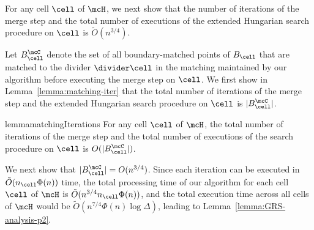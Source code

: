 
For any cell $\cell$ of $\mcH$, we next show that the number of iterations of the merge step and the total number of executions of the extended Hungarian search procedure on $\cell$ is $\tilde{O}(n^{3/4})$.


Let $B_\cell^\mcC$ denote the set of all boundary-matched points of $B_\cell$ that are matched to the divider $\divider\cell$ in the matching maintained by our algorithm before executing the merge step on $\cell$. We first show in Lemma~\ref{lemma:matching-iter} that the total number of iterations of the merge step and the extended Hungarian search procedure on $\cell$ is $|B_\cell^\mcC|$.



\begin{restatable}{lemma}{matchingIterations}\label{lemma:matching-iter}
    For any cell $\cell$ of $\mcH$, the total number of iterations of the merge step and the total number of executions of the search procedure on $\cell$ is $O(|B_\cell^\mcC|)$.
\end{restatable}





We next show that $|B_\cell^\mcC|=O(n^{3/4})$. 
Since each iteration can be executed in $\tilde{O}(n_\cell\Phi(n))$ time, the total processing time of our algorithm for each cell $\cell$ of $\mcH$ is $\tilde{O}(n^{3/4}n_\cell\Phi(n))$, and the total execution time across all cells of $\mcH$ would be $\tilde{O}(n^{7/4}\Phi(n)\log\Delta)$, leading to Lemma~\ref{lemma:GRS-analysis-p2}.

